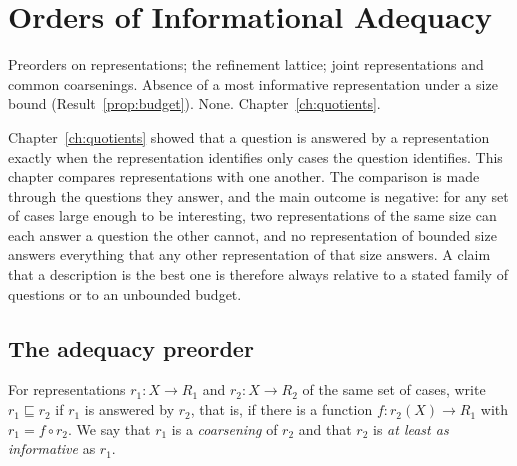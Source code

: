 \chapter{Orders of Informational Adequacy}\label{ch:adequacy}
{Preorders on representations; the refinement lattice; joint representations and common coarsenings.}
{Absence of a most informative representation under a size bound (Result~\ref{prop:budget}).}
{None.}
{Chapter~\ref{ch:quotients}.}

Chapter~\ref{ch:quotients} showed that a question is answered by a representation exactly when the representation identifies only cases the question identifies. This chapter compares representations with one another. The comparison is made through the questions they answer, and the main outcome is negative: for any set of cases large enough to be interesting, two representations of the same size can each answer a question the other cannot, and no representation of bounded size answers everything that any other representation of that size answers. A claim that a description is the best one is therefore always relative to a stated family of questions or to an unbounded budget.

\section{The adequacy preorder}

\begin{definition}\label{def:adequacy}
For representations $r_1:X\to R_1$ and $r_2:X\to R_2$ of the same set of cases, write $r_1\sqsubseteq r_2$ if $r_1$ is answered by $r_2$, that is, if there is a function $f:r_2(X)\to R_1$ with $r_1=f\circ r_2$. We say that $r_1$ is a \emph{coarsening} of $r_2$ and that $r_2$ is \emph{at least as informative} as $r_1$.
\end{definition}

